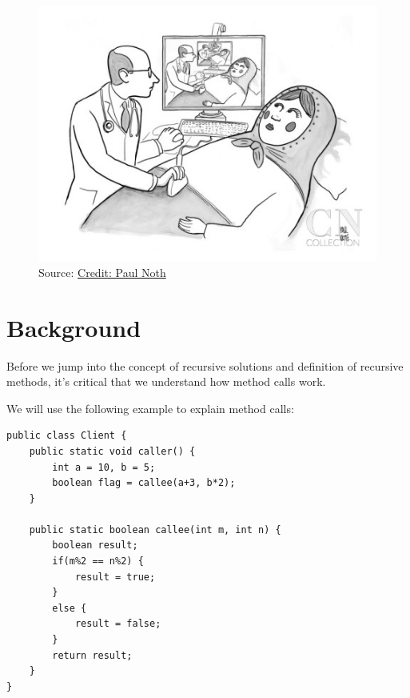 \def\topic{Recursion}


\begin{figure}
\centering	
\includegraphics[width=.4\textwidth]{images/russiandoll.jpg}
\caption{Source: \href{https://condenaststore.com/featured/a-doctor-is-seen-giving-an-sonogram-to-a-russian-paul-noth.html}{Credit: Paul Noth}}
\end{figure}

\section{Background}

Before we jump into the concept of recursive solutions and definition of recursive methods, it's critical that we understand how method calls work.

We will use the following example to explain method calls:

\begin{lstlisting}
public class Client {
	public static void caller() {
		int a = 10, b = 5;
		boolean flag = callee(a+3, b*2);
	}
	
	public static boolean callee(int m, int n) {
		boolean result;
		if(m%2 == n%2) {
			result = true;
		}
		else {
			result = false;
		}
		return result;
	}
}
\end{lstlisting}

